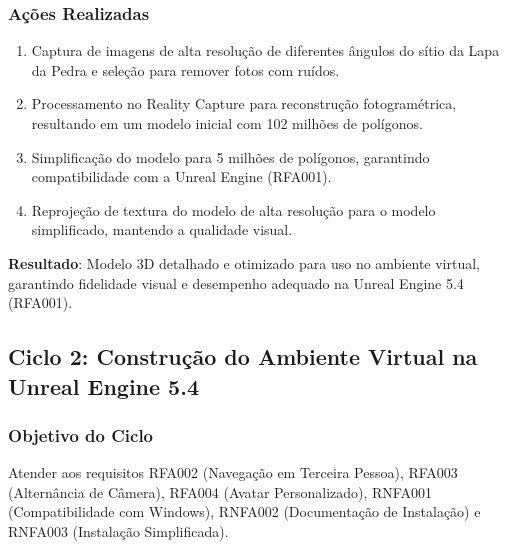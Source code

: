 \subsubsection*{Ações Realizadas}
\begin{enumerate}
    \item Captura de imagens de alta resolução de diferentes ângulos do sítio da Lapa da Pedra e seleção para remover fotos com ruídos.
    \item Processamento no Reality Capture para reconstrução fotogramétrica, resultando em um modelo inicial com 102 milhões de polígonos.
    \item Simplificação do modelo para 5 milhões de polígonos, garantindo compatibilidade com a Unreal Engine (RFA001).
    \item Reprojeção de textura do modelo de alta resolução para o modelo simplificado, mantendo a qualidade visual.
\end{enumerate}

\textbf{Resultado}: Modelo 3D detalhado e otimizado para uso no ambiente virtual, garantindo fidelidade visual e desempenho adequado na Unreal Engine 5.4 (RFA001).

\subsection*{Ciclo 2: Construção do Ambiente Virtual na Unreal Engine 5.4} \label{subsec:ciclo2}

\subsubsection*{Objetivo do Ciclo}
Atender aos requisitos RFA002 (Navegação em Terceira Pessoa), RFA003 (Alternância de Câmera), RFA004 (Avatar Personalizado), RNFA001 (Compatibilidade com Windows), RNFA002 (Documentação de Instalação) e RNFA003 (Instalação Simplificada).

